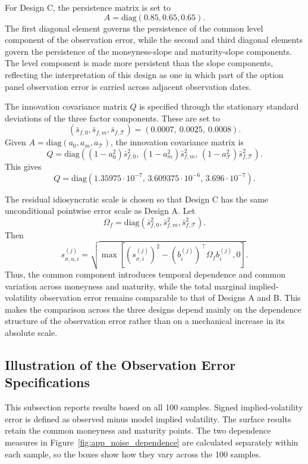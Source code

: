 \documentclass[11pt,a4paper,notitlepage]{article}
\numberwithin{equation}{section}
\begin{document}
For Design C, the persistence matrix is set to
\[
A=\mathrm{diag}(0.85,0.65,0.65).
\]
The first diagonal element governs the persistence of the common level component of the observation error, while the second and third diagonal elements govern the persistence of the moneyness-slope and maturity-slope components. The level component is made more persistent than the slope components, reflecting the interpretation of this design as one in which part of the option panel observation error is carried across adjacent observation dates.

The innovation covariance matrix $Q$ is specified through the stationary standard deviations of the three factor components. These are set to
\[
(\bar s_{f,0},\bar s_{f,m},\bar s_{f,\mathcal T})
=
(0.0007,\ 0.0025,\ 0.0008).
\]
Given $A=\mathrm{diag}(a_0,a_m,a_\mathcal T)$, the innovation covariance matrix is
\[
Q
=
\mathrm{diag}
\left(
(1-a_0^2)\bar s_{f,0}^2,\,
(1-a_m^2)\bar s_{f,m}^2,\,
(1-a_\mathcal T^2)\bar s_{f,\mathcal T}^2
\right).
\]
This gives
\[
Q
=
\mathrm{diag}
\left(
1.35975\cdot10^{-7},\,
3.609375\cdot10^{-6},\,
3.696\cdot10^{-7}
\right).
\]

The residual idiosyncratic scale is chosen so that Design C has the same unconditional pointwise error scale as Design A. Let
\[
\Omega_f
=
\mathrm{diag}
\left(
\bar s_{f,0}^2,\bar s_{f,m}^2,\bar s_{f,\mathcal T}^2
\right).
\]
Then
\[
s_{\sigma,u,i}^{(j)}
=
\sqrt{
\max\left[
\left(s_{\sigma,i}^{(j)}\right)^2
-
\left(b_i^{(j)}\right)^\top \Omega_f b_i^{(j)},
0
\right]
}.
\]
Thus, the common component introduces temporal dependence and common variation across moneyness and maturity, while the total marginal implied-volatility observation error remains comparable to that of Designs A and B. This makes the comparison across the three designs depend mainly on the dependence structure of the observation error rather than on a mechanical increase in its absolute scale.

\subsection{Illustration of the Observation Error Specifications}
\label{app:noise_visualisations}

This subsection reports results based on all 100 samples. Signed implied-volatility error is defined as observed minus model implied volatility. The surface results retain the common moneyness and maturity points. The two dependence measures in Figure~\ref{fig:app_noise_dependence} are calculated separately within each sample, so the boxes show how they vary across the 100 samples.
\end{document}

